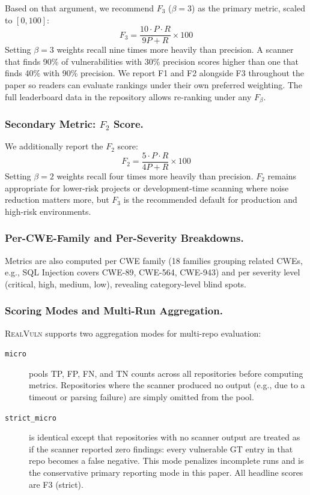 Based on that argument, we recommend $F_3$ ($\beta{=}3$) as the primary metric, scaled to $[0, 100]$:
\begin{equation}
  F_3 = \frac{10 \cdot P \cdot R}{9P + R} \times 100
  \label{eq:f3}
\end{equation}
Setting $\beta = 3$ weights recall nine times more heavily than precision. A scanner that finds 90\% of vulnerabilities with 30\% precision scores higher than one that finds 40\% with 90\% precision. We report F1 and F2 alongside F3 throughout the paper so readers can evaluate rankings under their own preferred weighting. The full leaderboard data in the repository allows re-ranking under any $F_\beta$.

\subsubsection{Secondary Metric: $F_2$ Score.}
We additionally report the $F_2$ score:
\begin{equation}
  F_2 = \frac{5 \cdot P \cdot R}{4P + R} \times 100
  \label{eq:f2}
\end{equation}
Setting $\beta = 2$ weights recall four times more heavily than precision. $F_2$ remains appropriate for lower-risk projects or development-time scanning where noise reduction matters more, but $F_3$ is the recommended default for production and high-risk environments.

\subsubsection{Per-CWE-Family and Per-Severity Breakdowns.}
Metrics are also computed per CWE family (18 families grouping related CWEs, e.g., SQL Injection covers CWE-89, CWE-564, CWE-943) and per severity level (critical, high, medium, low), revealing category-level blind spots.

\subsubsection{Scoring Modes and Multi-Run Aggregation.}
\textsc{RealVuln} supports two aggregation modes for multi-repo evaluation:

\begin{description}
  \item[\texttt{micro}] pools TP, FP, FN, and TN counts across all repositories before computing metrics. Repositories where the scanner produced no output (e.g., due to a timeout or parsing failure) are simply omitted from the pool.
  \item[\texttt{strict\_micro}] is identical except that repositories with no scanner output are treated as if the scanner reported zero findings: every vulnerable GT entry in that repo becomes a false negative. This mode penalizes incomplete runs and is the conservative primary reporting mode in this paper. All headline scores are F3 (strict).
\end{description}

